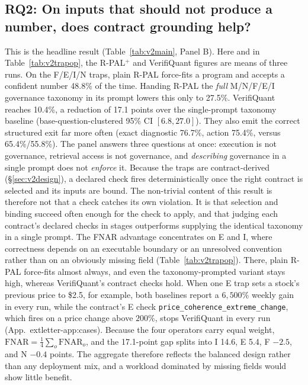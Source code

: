 \documentclass[sigconf]{acmart}
\newcommand{\govVQfnar}{10.4\%}           %
\newcommand{\govPromptFnar}{27.5\%}       %
\newcommand{\govPlainFnar}{48.8\%}        %
\newcommand{\govGap}{17.1}                %
\newcommand{\govCIlo}{6.8}                %
\newcommand{\govCIhi}{27.0}               %
\newcommand{\govVQdiag}{76.7\%}
\newcommand{\govVQaction}{75.4\%}
\newcommand{\govPromptDiag}{65.4\%}
\newcommand{\govPromptAction}{55.8\%}
\newif\ifarxiv
\newcommand{\extref}[1]{App.~\ifarxiv\ref{#1}\else\csname extletter-#1\endcsname\fi}
\begin{document}
\subsection{RQ2: On inputs that should not produce a number, does contract grounding help?}\label{sec:v2rq2}
This is the headline result (Table~\ref{tab:v2main}, Panel B). Here and in Table~\ref{tab:v2trapop}, the R-PAL$^{+}$ and VerifiQuant figures are means of three runs.
On the F/E/I/N traps, plain R-PAL force-fits a program and accepts a confident number \govPlainFnar{} of the time.
Handing R-PAL the \emph{full} M/N/F/E/I governance taxonomy in its prompt lowers this only to \govPromptFnar{}.
VerifiQuant reaches \govVQfnar{}, a reduction of \govGap{} points over the single-prompt taxonomy baseline (base-question-clustered 95\% CI $[\govCIlo{},\govCIhi{}]$). They also emit the correct structured exit far more often (exact diagnostic \govVQdiag{}, action \govVQaction{}, versus \govPromptDiag{}/\govPromptAction{}).
The panel answers three questions at once: execution is not governance, retrieval access is not governance, and \emph{describing} governance in a single prompt does not \emph{enforce} it.
Because the traps are contract-derived (\S\ref{sec:v2design}), a declared check fires deterministically once the right contract is selected and its inputs are bound. The non-trivial content of this result is therefore not that a check catches its own violation. It is that selection and binding succeed often enough for the check to apply, and that judging each contract's declared checks in stages outperforms supplying the identical taxonomy in a single prompt.
The FNAR advantage concentrates on E and I, where correctness depends on an executable boundary or an unresolved convention rather than on an obviously missing field (Table~\ref{tab:v2trapop}). There, plain R-PAL force-fits almost always, and even the taxonomy-prompted variant stays high, whereas VerifiQuant's contract checks hold. When one E trap sets a stock's previous price to \$2.5, for example, both baselines report a $6{,}500\%$ weekly gain in every run, while the contract's E check \texttt{price\_coherence\_\allowbreak extreme\_change}, which fires on a price change above $200\%$, stops VerifiQuant in every run (\extref{app:cases}).
Because the four operators carry equal weight, $\mathrm{FNAR}=\frac{1}{4}\sum_{o}\mathrm{FNAR}_o$, and the \govGap{}-point gap splits into I 14.6, E 5.4, F $-2.5$, and N $-0.4$ points. The aggregate therefore reflects the balanced design rather than any deployment mix, and a workload dominated by missing fields would show little benefit.
\end{document}
